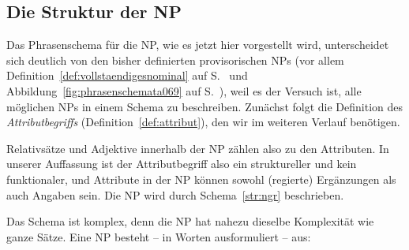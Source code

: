 \subsection{Die Struktur der NP}
\label{sec:diestrukturdernp}

Das Phrasenschema für die NP, wie es jetzt hier vorgestellt wird, unterscheidet sich deutlich von den bisher definierten provisorischen NPs (vor allem Definition~\ref{def:vollstaendigesnominal} auf S.~\pageref{def:vollstaendigesnominal} und Abbildung~\ref{fig:phrasenschemata069} auf S.~\pageref{fig:phrasenschemata069}), weil es der Versuch ist, alle möglichen NPs in einem Schema zu beschreiben.
Zunächst folgt die Definition des \textit{Attributbegriffs} (Definition~\ref{def:attribut}), den wir im weiteren Verlauf benötigen.


Relativsätze und Adjektive innerhalb der NP zählen also zu den Attributen.
In unserer Auffassung ist der Attributbegriff also ein struktureller und kein funktionaler, und Attribute in der NP können sowohl (regierte) Ergänzungen als auch Angaben sein.
Die NP wird durch Schema~\ref{str:ngr} beschrieben.



Das Schema ist komplex, denn die NP hat nahezu dieselbe Komplexität wie ganze Sätze.
Eine NP besteht -- in Worten ausformuliert -- aus:


